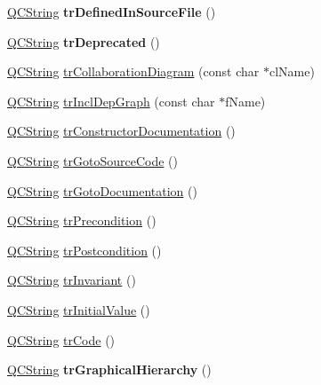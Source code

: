 \begin{DoxyCompactItemize}
\item 
\hypertarget{class_translator_italian_aa11e744c82b96bf72abdf5edeed3ea55}{\hyperlink{class_q_c_string}{Q\-C\-String} {\bfseries tr\-Defined\-In\-Source\-File} ()}\label{class_translator_italian_aa11e744c82b96bf72abdf5edeed3ea55}

\item 
\hypertarget{class_translator_italian_ae6520e844a4d922882ef91f7598c792f}{\hyperlink{class_q_c_string}{Q\-C\-String} {\bfseries tr\-Deprecated} ()}\label{class_translator_italian_ae6520e844a4d922882ef91f7598c792f}

\item 
\hyperlink{class_q_c_string}{Q\-C\-String} \hyperlink{class_translator_italian_abdf1261377a3060749df99b6a28e38f4}{tr\-Collaboration\-Diagram} (const char $\ast$cl\-Name)
\item 
\hyperlink{class_q_c_string}{Q\-C\-String} \hyperlink{class_translator_italian_aa6d9df1b1ff80e60a9b96a593eb19cd6}{tr\-Incl\-Dep\-Graph} (const char $\ast$f\-Name)
\item 
\hyperlink{class_q_c_string}{Q\-C\-String} \hyperlink{class_translator_italian_aebd617a17c50cfbf8d1913f8512c609f}{tr\-Constructor\-Documentation} ()
\item 
\hyperlink{class_q_c_string}{Q\-C\-String} \hyperlink{class_translator_italian_a88de708e5c02579159f43d7eb122dc76}{tr\-Goto\-Source\-Code} ()
\item 
\hyperlink{class_q_c_string}{Q\-C\-String} \hyperlink{class_translator_italian_a5af78266c0a9774a0c8485691734746b}{tr\-Goto\-Documentation} ()
\item 
\hyperlink{class_q_c_string}{Q\-C\-String} \hyperlink{class_translator_italian_a012fba3db58cd80b7bfededef750329b}{tr\-Precondition} ()
\item 
\hyperlink{class_q_c_string}{Q\-C\-String} \hyperlink{class_translator_italian_a9e223ace863721b2c2a4254b1465d5ed}{tr\-Postcondition} ()
\item 
\hyperlink{class_q_c_string}{Q\-C\-String} \hyperlink{class_translator_italian_ae5f2fceb865e8a8772c5ee2b7cefc85b}{tr\-Invariant} ()
\item 
\hyperlink{class_q_c_string}{Q\-C\-String} \hyperlink{class_translator_italian_a79bb2ccb93ffb10fd595e96bc03fae7e}{tr\-Initial\-Value} ()
\item 
\hyperlink{class_q_c_string}{Q\-C\-String} \hyperlink{class_translator_italian_a16e9b5f97deae37b7f61d8785134e588}{tr\-Code} ()
\item 
\hypertarget{class_translator_italian_ae55585b4aa78c71c8c6e8dbd8955531c}{\hyperlink{class_q_c_string}{Q\-C\-String} {\bfseries tr\-Graphical\-Hierarchy} ()}\label{class_translator_italian_ae55585b4aa78c71c8c6e8dbd8955531c}


\end{DoxyCompactItemize}
